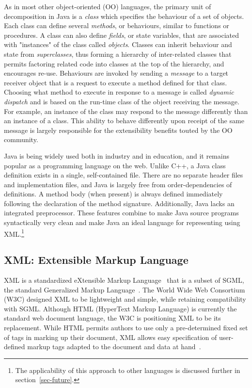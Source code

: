 \documentclass{article}
\begin{document}
\begin{multicols}{2}
As in most other object-oriented (OO) languages, the primary unit of
decomposition in Java is a \emph{class} which specifies the behaviour of
a set of objects.  Each class can define several \emph{methods}, or
behaviours, similar to functions or procedures. A class can also define
\emph{fields}, or state variables, that are associated with "instances"
of the class called \emph{objects}. Classes can inherit behaviour and
state from \emph{superclasses}, thus forming a hierarchy of
inter-related classes that permits factoring related code into classes
at the top of the hierarchy, and encourages re-use.  Behaviours are
invoked by sending a \emph{message} to a target receiver object that is
a request to execute a method defined for that class.  Choosing what
method to execute in response to a message is called \emph{dynamic
  dispatch} and is based on the run-time class of the object receiving
the message.  For example, an instance of the 
class may respond to the  message differently than an
instance of a  class.  This ability to behave differently
upon receipt of the same message is largely responsible for the
extensibility benefits touted by the OO community.
    

Java is being widely used both in industry and in education, and it
remains popular as a programming language on the web.  Unlike C++, a
Java class definition exists in a single, self-contained file.  There
are no separate header files and implementation files, and Java is
largely free from order-dependencies of definitions.  A method body
(when present) is always defined immediately following the declaration
of the method signature.  Additionally, Java lacks an integrated
preprocessor.  These features combine to make Java source programs
syntactically very clean and make Java an ideal language for
representing using XML.\footnote{The applicability of this approach to
  other languages is discussed further in section~\ref{sec-future}.}

\subsection{XML: Extensible Markup Language}

XML is a standardized eXtensible Markup Language~\cite{XML} that is a
subset of SGML, the standard Generalized Markup Language~\cite{SGML}.
The World Wide Web Consortium (W3C) designed XML to be lightweight and
simple, while retaining compatibility with SGML.  Although HTML
(HyperText Markup Language) is currently the standard web document
language, the W3C is positioning XML to be its replacement.  While HTML
permits authors to use only a pre-determined fixed set of tags in
marking up their document, XML allows easy specification of user-defined
markup tags adapted to the document and data at
hand~\cite{Goosens99,Goldfarb98}.


\end{multicols}
\end{document}
